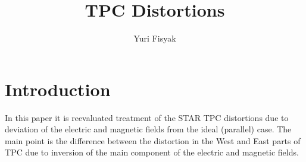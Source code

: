 \documentclass[12pt]{article} %
\title{TPC Distortions}
\author{Yuri Fisyak}
\begin{document}
\maketitle
\section{Introduction}
\par
In this paper it is reevaluated treatment of the STAR TPC distortions due to deviation of the electric and magnetic fields from the ideal (parallel) case. The main point is the difference between the distortion in the West and East parts of TPC due to inversion of the main component of the electric and magnetic fields. 
\end{document}

